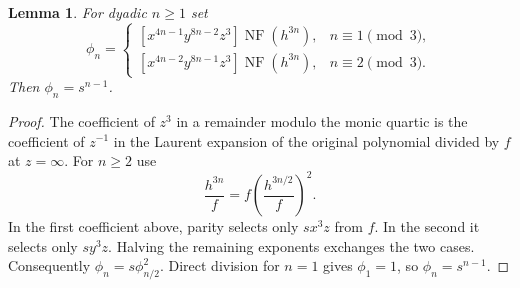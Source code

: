 \documentclass[11pt,a4paper,reqno]{amsart}
\numberwithin{equation}{section}
\theoremstyle{plain}
\newtheorem{lemma}[theorem]{Lemma}
\theoremstyle{definition}
\theoremstyle{remark}
\DeclareMathOperator{\NF}{NF}
\begin{document}
\begin{lemma}\label{lem:infty-coefficient}
For dyadic $n\geq1$ set
\[
\phi_n=\begin{cases}
[x^{4n-1}y^{8n-2}z^3]\NF(h^{3n}),&n\equiv1\pmod3,\\
[x^{4n-2}y^{8n-1}z^3]\NF(h^{3n}),&n\equiv2\pmod3.
\end{cases}
\]
Then $\phi_n=s^{n-1}$.
\end{lemma}
\begin{proof}
The coefficient of $z^3$ in a remainder modulo the monic quartic is the coefficient of $z^{-1}$ in the Laurent expansion of the original polynomial divided by $f$ at $z=\infty$. For $n\geq2$ use
\[
\frac{h^{3n}}f=f\left(\frac{h^{3n/2}}f\right)^2.
\]
In the first coefficient above, parity selects only $sx^3z$ from $f$. In the second it selects only $sy^3z$. Halving the remaining exponents exchanges the two cases. Consequently $\phi_n=s\phi_{n/2}^2$. Direct division for $n=1$ gives $\phi_1=1$, so $\phi_n=s^{n-1}$.
\end{proof}
\end{document}
